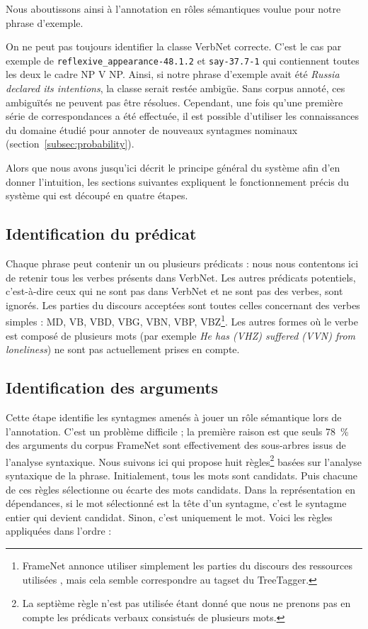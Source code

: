Nous aboutissons ainsi à l'annotation en rôles sémantiques voulue pour notre
phrase d'exemple.

On ne peut pas toujours identifier la classe VerbNet correcte. C'est le cas par
exemple de \texttt{reflexive\_appearance-48.1.2} et \texttt{say-37.7-1} qui
contiennent toutes les deux le cadre NP V NP. Ainsi, si notre phrase d'exemple
avait été \textit{Russia declared its intentions}, la classe serait restée
ambigüe. Sans corpus annoté, ces ambiguïtés ne peuvent pas être résolues.
Cependant, une fois qu'une première série de correspondances a été effectuée,
il est possible d'utiliser les connaissances du domaine étudié pour annoter de
nouveaux syntagmes nominaux (section~\ref{subsec:probability}).

Alors que nous avons jusqu'ici décrit le principe général du système afin d'en
donner l'intuition, les sections suivantes expliquent le fonctionnement précis
du système qui est découpé en quatre étapes.

\subsection{Identification du prédicat}

Chaque phrase peut contenir un ou plusieurs prédicats : nous nous contentons
ici de retenir tous les verbes présents dans VerbNet. Les autres prédicats
potentiels, c'est-à-dire ceux qui ne sont pas dans VerbNet et ne sont pas des
verbes, sont ignorés. Les parties du discours acceptées sont toutes celles
concernant des verbes simples : MD, VB, VBD, VBG, VBN, VBP,
VBZ\footnote{FrameNet annonce utiliser simplement les parties du discours des
    ressources utilisées \citep[section~3.1]{ruppenhofer2006extended}, mais
    cela semble correspondre au tagset du TreeTagger.}. Les autres formes où le
    verbe est composé de plusieurs mots (par exemple \textit{He has (VHZ)
    suffered (VVN) from loneliness}) ne sont pas actuellement prises en compte.

\subsection{Identification des arguments}
\label{argid}

Cette étape identifie les syntagmes amenés à jouer un rôle sémantique lors de
l'annotation. C'est un problème difficile ; la première raison est que seuls
78~\% des arguments du corpus FrameNet sont effectivement des sous-arbres issus
de l'analyse syntaxique. Nous suivons ici \cite{lang2011unsupervised} qui
propose huit règles\footnote{La septième règle n'est pas utilisée étant donné
    que nous ne prenons pas en compte les prédicats verbaux consistués de
plusieurs mots.} basées sur l'analyse syntaxique de la phrase. Initialement,
tous les mots sont candidats. Puis chacune de ces règles sélectionne ou écarte
des mots candidats. Dans la représentation en dépendances, si le mot
sélectionné est la tête d'un syntagme, c'est le syntagme entier qui devient
candidat. Sinon, c'est uniquement le mot.  Voici les règles appliquées dans
l'ordre :

